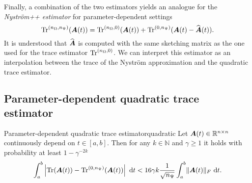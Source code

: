 \documentclass[12pt]{article}
\begin{document}
Finally, a combination of the two estimators yields an analogue for the \emph{Nyström++ estimator} \cite{persson-2022-improved-variants} for parameter-dependent settings 
\begin{equation}
    \operatorname{Tr}^{(n_{\Omega}, n_{\Psi})}(\boldsymbol{A}(t)) = \operatorname{Tr}^{(n_{\Omega}, 0)}(\boldsymbol{A}(t)) + \operatorname{Tr}^{(0, n_{\Psi})}(\boldsymbol{A}(t) - \widehat{\boldsymbol{A}}(t)).
\end{equation}
It is understood that $\widehat{\boldsymbol{A}}$ is computed with the same sketching matrix as the one used for the trace estimator $\operatorname{Tr}^{(n_{\Omega}, 0)}$. We can interpret this estimator as an interpolation between the trace of the Nystr\"om approximation and the quadratic trace estimator.

\subsection{Parameter-dependent quadratic trace estimator}
\label{subsec:hutchinson}

\begin{theorem}{Parameter-dependent quadratic trace estimator}{quadratic}
    Let $\boldsymbol{A}(t) \in \mathbb{R}^{n \times n}$ continuously depend on $t \in [a, b]$. Then for any $k \in \mathbb{N}$ and $\gamma \geq 1$ it holds with probability at least $1 - \gamma^{-2k}$
    \begin{equation}
        \int_{a}^{b} \left| \operatorname{Tr}(\boldsymbol{A}(t)) - \operatorname{Tr}^{(0, n_{\Psi})}(\boldsymbol{A}(t)) \right| ~\mathrm{d}t < 16 \gamma k \frac{1}{\sqrt{n_{\Psi}}} \int_{a}^{b} \lVert \boldsymbol{A}(t) \rVert _F  ~\mathrm{d}t.
    \end{equation}
\end{theorem}
\end{document}

